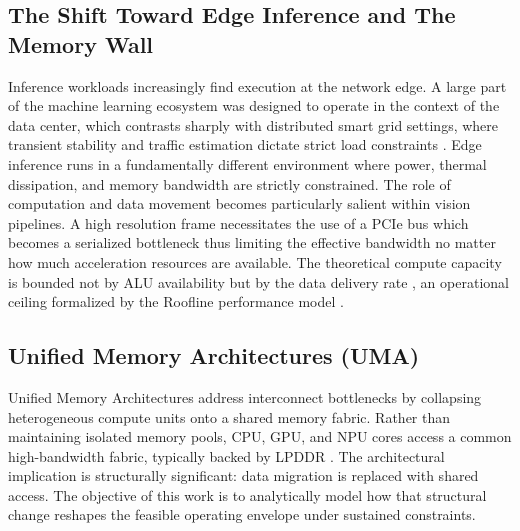 \documentclass[conference]{IEEEtran}
\begin{document}
\subsection{The Shift Toward Edge Inference and The Memory Wall}
Inference workloads increasingly find execution at the network edge. A large part of the machine learning ecosystem was designed to operate in the context of the data center, which contrasts sharply with distributed smart grid settings, where transient stability and traffic estimation dictate strict load constraints \cite{b_smartgrid_2016, b_ipfc_2013}. Edge inference runs in a fundamentally different environment where power, thermal dissipation, and memory bandwidth are strictly constrained. The role of computation and data movement becomes particularly salient within vision pipelines. A high resolution frame necessitates the use of a PCIe bus which becomes a serialized bottleneck thus limiting the effective bandwidth no matter how much acceleration resources are available. The theoretical compute capacity is bounded not by ALU availability but by the data delivery rate \cite{b17}, an operational ceiling formalized by the Roofline performance model \cite{b_roofline}.

\subsection{Unified Memory Architectures (UMA)}
Unified Memory Architectures address interconnect bottlenecks by collapsing heterogeneous compute units onto a shared memory fabric. Rather than maintaining isolated memory pools, CPU, GPU, and NPU cores access a common high-bandwidth fabric, typically backed by LPDDR \cite{b16, b11}. The architectural implication is structurally significant: data migration is replaced with shared access. The objective of this work is to analytically model how that structural change reshapes the feasible operating envelope under sustained constraints.
\end{document}
